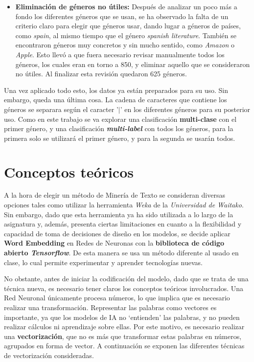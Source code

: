 \documentclass[12pt,a4paper, xcolor=table]{article}
\begin{document}
\begin{itemize}
            \item \textbf{Eliminación de géneros no útiles:} Después de analizar un poco más a fondo los diferentes géneros que se usan, se ha observado la falta de un criterio claro para elegir que géneros usar, dando lugar a géneros de países, como \textit{spain}, al mismo tiempo que el género \textit{spanish literature}. También se encontraron géneros muy concretos y sin mucho sentido, como \textit{Amazon} o \textit{Apple}. Esto llevó a que fuera necesario revisar manualmente todos los géneros, los cuales eran en torno a 850, y eliminar aquello que se consideraron no útiles. Al finalizar esta revisión quedaron 625 géneros.
        \end{itemize}

    \vspace{3mm}

    Una vez aplicado todo esto, los datos ya están preparados para su uso. Sin embargo, queda una última cosa. La cadena de caracteres que contiene los géneros se separara según el caracter '$|$' en los diferentes géneros para su posterior uso. Como en este trabajo se va explorar una clasificación \textbf{multi-clase} con el primer género, y una clasificación \textit{\textbf{multi-label}} con todos los géneros, para la primera solo se utilizará el primer género, y para la segunda se usarán todos.

\newpage

\section{Conceptos teóricos}
A la hora de elegir un método de Minería de Texto se consideran diversas opciones tales como utilizar la herramienta \textit{Weka} de la \textit{Universidad de Waitako}. Sin embargo, dado que esta herramienta ya ha sido utilizada a lo largo de la asignatura y, además, presenta ciertas limitaciones en cuanto a la flexibilidad y capacidad de toma de decisiones de diseño en los modelos, se decide aplicar \textbf{Word Embedding} en Redes de Neuronas con la \textbf{biblioteca de código abierto \textit{Tensorflow}}\cite{tf}. De esta manera se usa un método diferente al usado en clase, lo cual permite experimentar y aprender tecnologías nuevas.

\vspace{3mm}

No obstante, antes de iniciar la codificación del modelo, dado que se trata de una técnica nueva, es necesario tener claros los conceptos teóricos involucrados. Una Red Neuronal únicamente procesa números, lo que implica que es necesario realizar una transformación. Representar las palabras como vectores es importante, ya que los modelos de IA no ‘entienden’ las palabras, y no pueden realizar cálculos ni aprendizaje sobre ellas. Por este motivo, es necesario realizar una \textbf{vectorización}, que no es más que transformar estas palabras en números, agrupados en forma de vector. A continuación se exponen las diferentes técnicas de vectorización consideradas.
\end{document}
